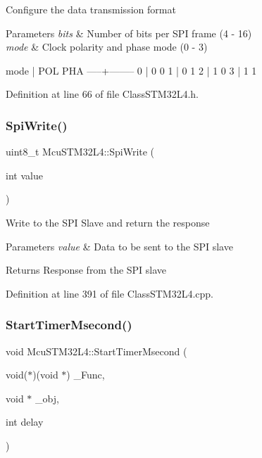 Configure the data transmission format


\begin{DoxyParams}{Parameters}
{\em bits} & Number of bits per S\+PI frame (4 -\/ 16) \\
\hline
{\em mode} & Clock polarity and phase mode (0 -\/ 3)\\
\hline
\end{DoxyParams}

\begin{DoxyCode}
mode | POL PHA
-----+--------
  0  |  0   0
  1  |  0   1
  2  |  1   0
  3  |  1   1
\end{DoxyCode}
 

Definition at line 66 of file Class\+S\+T\+M32\+L4.\+h.

\mbox{\label{class_mcu_s_t_m32_l4_a28153235a63de20319f944b692f30585}} 
\subsubsection{\texorpdfstring{Spi\+Write()}{SpiWrite()}}
{\footnotesize\ttfamily uint8\+\_\+t Mcu\+S\+T\+M32\+L4\+::\+Spi\+Write (\begin{DoxyParamCaption}\item[{int}]{value }\end{DoxyParamCaption})}

Write to the S\+PI Slave and return the response


\begin{DoxyParams}{Parameters}
{\em value} & Data to be sent to the S\+PI slave\\
\hline
\end{DoxyParams}
\begin{DoxyReturn}{Returns}
Response from the S\+PI slave 
\end{DoxyReturn}


Definition at line 391 of file Class\+S\+T\+M32\+L4.\+cpp.

\mbox{\label{class_mcu_s_t_m32_l4_adfcfb7d44411a41adb849b57c5b55ce8}} 
\subsubsection{\texorpdfstring{Start\+Timer\+Msecond()}{StartTimerMsecond()}}
{\footnotesize\ttfamily void Mcu\+S\+T\+M32\+L4\+::\+Start\+Timer\+Msecond (\begin{DoxyParamCaption}\item[{void($\ast$)(void $\ast$)}]{\+\_\+\+Func,  }\item[{void $\ast$}]{\+\_\+obj,  }\item[{int}]{delay }\end{DoxyParamCaption})}

